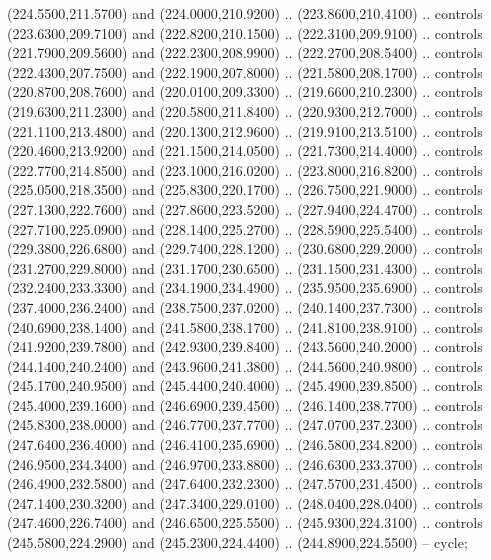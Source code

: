 {\begin{scope}[y=0.80pt, x=0.80pt, yscale=-1, xscale=1, inner sep=0pt, outer sep=0pt, #1]
      (224.5500,211.5700) and (224.0000,210.9200) .. (223.8600,210.4100) .. controls
      (223.6300,209.7100) and (222.8200,210.1500) .. (222.3100,209.9100) .. controls
      (221.7900,209.5600) and (222.2300,208.9900) .. (222.2700,208.5400) .. controls
      (222.4300,207.7500) and (222.1900,207.8000) .. (221.5800,208.1700) .. controls
      (220.8700,208.7600) and (220.0100,209.3300) .. (219.6600,210.2300) .. controls
      (219.6300,211.2300) and (220.5800,211.8400) .. (220.9300,212.7000) .. controls
      (221.1100,213.4800) and (220.1300,212.9600) .. (219.9100,213.5100) .. controls
      (220.4600,213.9200) and (221.1500,214.0500) .. (221.7300,214.4000) .. controls
      (222.7700,214.8500) and (223.1000,216.0200) .. (223.8000,216.8200) .. controls
      (225.0500,218.3500) and (225.8300,220.1700) .. (226.7500,221.9000) .. controls
      (227.1300,222.7600) and (227.8600,223.5200) .. (227.9400,224.4700) .. controls
      (227.7100,225.0900) and (228.1400,225.2700) .. (228.5900,225.5400) .. controls
      (229.3800,226.6800) and (229.7400,228.1200) .. (230.6800,229.2000) .. controls
      (231.2700,229.8000) and (231.1700,230.6500) .. (231.1500,231.4300) .. controls
      (232.2400,233.3300) and (234.1900,234.4900) .. (235.9500,235.6900) .. controls
      (237.4000,236.2400) and (238.7500,237.0200) .. (240.1400,237.7300) .. controls
      (240.6900,238.1400) and (241.5800,238.1700) .. (241.8100,238.9100) .. controls
      (241.9200,239.7800) and (242.9300,239.8400) .. (243.5600,240.2000) .. controls
      (244.1400,240.2400) and (243.9600,241.3800) .. (244.5600,240.9800) .. controls
      (245.1700,240.9500) and (245.4400,240.4000) .. (245.4900,239.8500) .. controls
      (245.4000,239.1600) and (246.6900,239.4500) .. (246.1400,238.7700) .. controls
      (245.8300,238.0000) and (246.7700,237.7700) .. (247.0700,237.2300) .. controls
      (247.6400,236.4000) and (246.4100,235.6900) .. (246.5800,234.8200) .. controls
      (246.9500,234.3400) and (246.9700,233.8800) .. (246.6300,233.3700) .. controls
      (246.4900,232.5800) and (247.6400,232.2300) .. (247.5700,231.4500) .. controls
      (247.1400,230.3200) and (247.3400,229.0100) .. (248.0400,228.0400) .. controls
      (247.4600,226.7400) and (246.6500,225.5500) .. (245.9300,224.3100) .. controls
      (245.5800,224.2900) and (245.2300,224.4400) .. (244.8900,224.5500) -- cycle;


\end{scope}}
